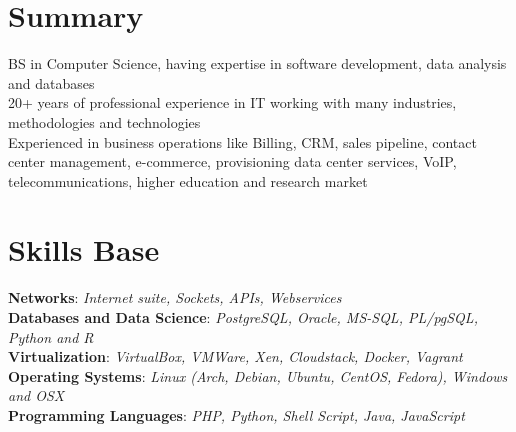 \documentclass[margin]{res}
\begin{document}
\fontsize{9}{12}
\selectfont
\address{\textbf{ANDRE LEITE REIS} \\
         London, UK \\
         andre.reis@gmail.com \\
         +44 074 8210 1626 \\
         linkedin.com/in/andreleitereis \\
         github.com/reis \\
         twitter.com/mrkings }

\begin{resume}
\section{Summary}
    BS in Computer Science, having expertise in software development, data analysis and databases \\
    20+ years of professional experience in IT working with many industries, methodologies and technologies \\
    Experienced in business operations like Billing, CRM, sales pipeline, contact center management, e-commerce, provisioning data center services, VoIP, telecommunications, higher education and research market \\

\section{Skills Base}
    \textbf{Networks}: \textit{Internet suite, Sockets, APIs, Webservices} \\
    \textbf{Databases and Data Science}: \textit{PostgreSQL, Oracle, MS-SQL, PL/pgSQL, Python and R} \\
    \textbf{Virtualization}: \textit{VirtualBox, VMWare, Xen, Cloudstack, Docker, Vagrant} \\
    \textbf{Operating Systems}: \textit{Linux (Arch, Debian, Ubuntu, CentOS, Fedora), Windows and OSX} \\
    \textbf{Programming Languages}: \textit{PHP, Python, Shell Script, Java, JavaScript} \\


\end{resume}
\end{document}
